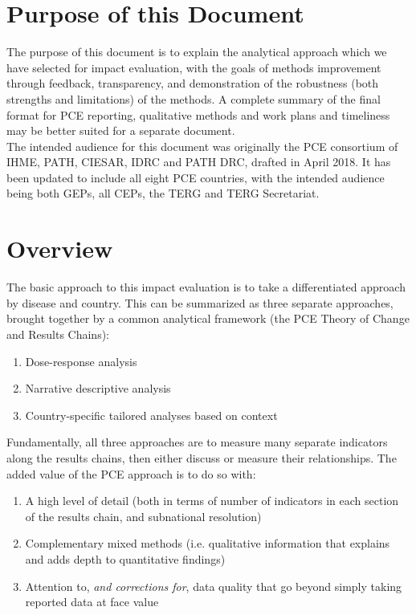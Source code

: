 \documentclass[twocolumn]{bmcart}%
\begin{document}

\section{Purpose of this Document}
The purpose of this document is to explain the analytical approach which we have selected for impact evaluation, with the goals of methods improvement through feedback, transparency, and demonstration of the robustness (both strengths and limitations) of the methods. A complete summary of the final format for PCE reporting, qualitative methods and work plans and timeliness may be better suited for a separate document. \\

The intended audience for this document was originally the PCE consortium of IHME, PATH, CIESAR, IDRC and PATH DRC, drafted in April 2018. It has been updated to include all eight PCE countries, with the intended audience being both GEPs, all CEPs, the TERG and TERG Secretariat.

\section{Overview}
The basic approach to this impact evaluation is to take a differentiated approach by disease and country. This can be summarized as three separate approaches, brought together by a common analytical framework (the PCE Theory of Change and Results Chains):

\begin{enumerate}
  \item Dose-response analysis
  \item Narrative descriptive analysis
  \item Country-specific tailored analyses based on context
\end{enumerate}
\smallskip

Fundamentally, all three approaches are to measure many separate indicators along the results chains, then either discuss or measure their relationships. The added value of the PCE approach is to do so with:
\begin{enumerate}
  \item A high level of detail (both in terms of number of indicators in each section of the results chain, and subnational resolution)
  \item Complementary mixed methods (i.e. qualitative information that explains and adds depth to quantitative findings)
  \item Attention to, \textit{and corrections for}, data quality that go beyond simply taking reported data at face value
\end{enumerate}
\smallskip
\end{document}
